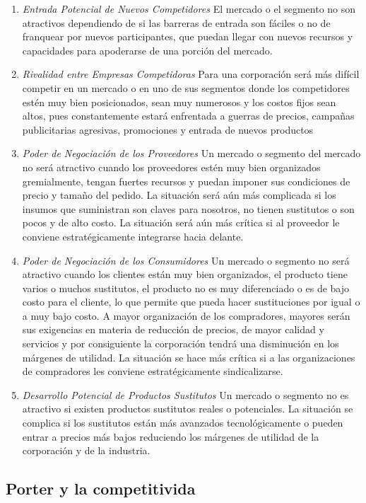\begin{enumerate}
	\item \emph{Entrada Potencial de Nuevos Competidores}
		El mercado o el segmento no son atractivos dependiendo de si las barreras de entrada son fáciles
		o no de franquear por nuevos participantes, que puedan llegar con nuevos recursos y capacidades
		para apoderarse de una porción del mercado.
	\item \emph{Rivalidad entre Empresas Competidoras}
		Para una corporación será más difícil competir en un mercado o en uno de sus segmentos donde los
		competidores estén muy bien posicionados, sean muy numerosos y los costos fijos sean altos, pues
		constantemente estará enfrentada a guerras de precios, campañas publicitarias agresivas, promociones
		y entrada de nuevos productos
	\item \emph{Poder de Negociación de los Proveedores}
		Un mercado o segmento del mercado no será atractivo cuando los proveedores estén muy bien organizados
		gremialmente, tengan fuertes recursos y puedan imponer sus condiciones de precio y tamaño del pedido.
		La situación será aún más complicada si los insumos que suministran son claves para nosotros, no tienen
		sustitutos o son pocos y de alto costo. La situación será aún más crítica si al proveedor le conviene
		estratégicamente integrarse hacia delante.
	\item \emph{Poder de Negociación de los Consumidores}
		Un mercado o segmento no será atractivo cuando los clientes están muy bien organizados, el producto
		tiene varios o muchos sustitutos, el producto no es muy diferenciado o es de bajo costo para el cliente,
		lo que permite que pueda hacer sustituciones por igual o a muy bajo costo. A mayor organización de los
		compradores, mayores serán sus exigencias en materia de reducción de precios, de mayor calidad y servicios
		y por consiguiente la corporación tendrá una disminución en los márgenes de utilidad. La situación se hace
		más crítica si a las organizaciones de compradores les conviene estratégicamente sindicalizarse.
	\item \emph{Desarrollo Potencial de Productos Sustitutos}
		Un mercado o segmento no es atractivo si existen productos sustitutos reales o potenciales. La situación
		se complica si los sustitutos están más avanzados tecnológicamente o pueden entrar a precios más bajos
		reduciendo los márgenes de utilidad de la corporación y de la industria.
\end{enumerate}

\subsection*{Porter y la competitivida}


